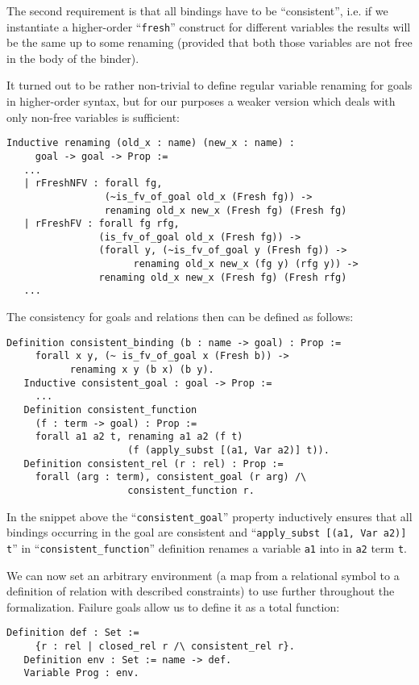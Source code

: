 The second requirement is that all bindings have to be ``consistent'', i.e. if we instantiate a higher-order ``\lstinline|fresh|''
construct for different variables the results will be the same up to some renaming (provided that both those variables are not free in
the body of the binder).  { \color{orange} It turned out to be rather non-trivial to define regular variable renaming for goals in higher-order syntax, but for our purposes
a weaker version which deals with only non-free variables is sufficient:

\begin{lstlisting}[language=Coq]
   Inductive renaming (old_x : name) (new_x : name) :
     goal -> goal -> Prop :=
   ...
   | rFreshNFV : forall fg,
                 (~is_fv_of_goal old_x (Fresh fg)) ->
                 renaming old_x new_x (Fresh fg) (Fresh fg)
   | rFreshFV : forall fg rfg,
                (is_fv_of_goal old_x (Fresh fg)) ->
                (forall y, (~is_fv_of_goal y (Fresh fg)) ->
                      renaming old_x new_x (fg y) (rfg y)) ->
                renaming old_x new_x (Fresh fg) (Fresh rfg)
   ...
\end{lstlisting}

The consistency for goals and relations then can be defined as follows:

\begin{lstlisting}[language=Coq]
   Definition consistent_binding (b : name -> goal) : Prop :=
     forall x y, (~ is_fv_of_goal x (Fresh b)) ->
           renaming x y (b x) (b y).
   Inductive consistent_goal : goal -> Prop :=
     ...
   Definition consistent_function
     (f : term -> goal) : Prop :=
     forall a1 a2 t, renaming a1 a2 (f t)
                     (f (apply_subst [(a1, Var a2)] t)).
   Definition consistent_rel (r : rel) : Prop :=
     forall (arg : term), consistent_goal (r arg) /\
                     consistent_function r.
\end{lstlisting}

In the snippet above the ``\lstinline[language=Coq]{consistent_goal}'' property inductively ensures that all bindings occurring
in the goal are consistent and ``\lstinline[language=Coq]{apply_subst [(a1, Var a2)] t}'' in ``\lstinline[language=Coq]{consistent_function}''
definition renames a variable \lstinline[language=Coq]{a1} into in \lstinline[language=Coq]{a2} term \lstinline[language=Coq]{t}.

}

We can now set an arbitrary environment (a map from a relational symbol to a definition of relation with described constraints) to use further throughout the formalization.
Failure goals allow us to define it as a total function:

\begin{lstlisting}[language=Coq]
   Definition def : Set := 
     {r : rel | closed_rel r /\ consistent_rel r}.
   Definition env : Set := name -> def.
   Variable Prog : env.
\end{lstlisting}
